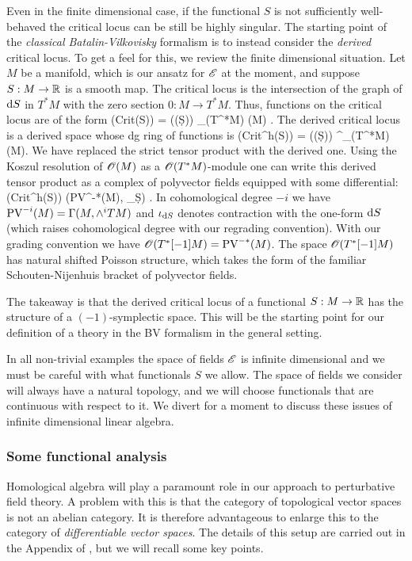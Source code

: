 Even in the finite dimensional case, if the functional $S$ is not sufficiently well-behaved the critical locus can be still be highly singular. 
The starting point of the {\em classical Batalin-Vilkovisky} formalism is to instead consider the {\em derived} critical locus.
To get a feel for this, we review the finite dimensional situation.
Let $M$ be a manifold, which is our ansatz for $\mathscr E$ at the moment, and suppose $S : M \to \mathbb R$ is a smooth map.
The critical locus is the intersection of the graph of ${\rm d} S$ in $T^*M$ with the zero section $0 : M \to T^*M$.
Thus, functions on the critical locus are of the form
\ben
\sO({\rm Crit}(S)) = \sO(\Gamma(\d S)) \tensor_{\sO(T^*M)} \sO(M) .
\een
The derived critical locus is a derived space whose dg ring of functions is 
\ben
\sO({\rm Crit}^{h}(S)) = \sO(\Gamma(\d S)) \tensor^{\LL}_{\sO(T^*M)} \sO(M).
\een
We have replaced the strict tensor product with the derived one.
Using the Koszul resolution of $\mathscr O(M)$ as a $\mathscr O(T^*M)$-module one can write this derived tensor product as a complex of polyvector fields equipped with some differential:
\ben
\sO({\rm Crit}^h(S)) \simeq \left({\rm PV}^{-*}(M), \iota_{\d S}\right) .
\een
In cohomological degree $-i$ we have ${\rm PV}^{-i} (M) = \Gamma(M, \wedge^i TM)$ and $\iota_{{\rm d} S}$ denotes contraction with the one-form ${\rm d} S$ (which raises cohomological degree with our regrading convention).
With our grading convention we have $\mathscr O(T^*[-1] M) = {\rm PV}^{-*}(M)$. 
The space $\mathscr O(T^*[-1]M)$ has natural shifted Poisson structure, which takes the form of the familiar Schouten-Nijenhuis bracket of polyvector fields.

The takeaway is that the derived critical locus of a functional $S : M \to \mathbb R$ has the structure of a $(-1)$-symplectic space.
This will be the starting point for our definition of a theory in the BV formalism in the general setting.
 
In all non-trivial examples the space of fields $\mathscr E$ is infinite dimensional and we must be careful with what functionals $S$ we allow.
The space of fields we consider will always have a natural topology, and we will choose functionals that are continuous with respect to it. 
We divert for a moment to discuss these issues of infinite dimensional linear algebra.

\subsubsection{Some functional analysis}
Homological algebra will play a paramount role in our approach to perturbative field theory.
A problem with this is that the category of topological vector spaces is not an abelian category.
It is therefore advantageous to enlarge this to the category of {\em differentiable vector spaces}.
The details of this setup are carried out in the Appendix of \cite{CG1}, but we will recall some key points.

